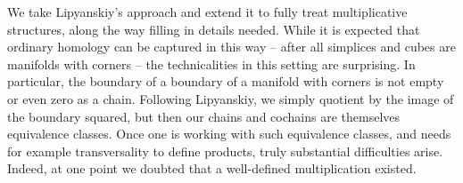 We take Lipyanskiy's approach and extend it to fully treat multiplicative structures, along the way filling in details needed.
While it is expected that ordinary homology can be captured in this way -- after all simplices and cubes are manifolds with corners -- the technicalities in this setting are surprising.
In particular, the boundary of a boundary of a manifold with corners is not empty or even zero as a chain.
Following Lipyanskiy, we simply quotient by the image of the boundary squared, but then our chains and cochains are themselves equivalence classes.
Once one is working with such equivalence classes, and needs for example transversality to define products, truly substantial difficulties arise.
Indeed, at one point we doubted that a well-defined multiplication existed.

